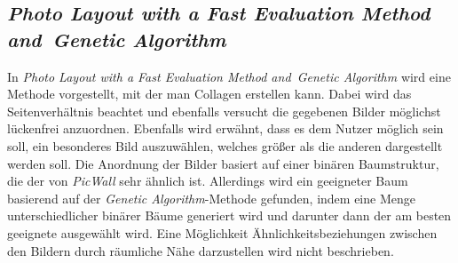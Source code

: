 \documentclass[12pt, ngerman, utf8]{article}
\begin{document}
\subsection{\emph{Photo Layout with a Fast Evaluation Method and Genetic Algorithm}}
In \emph{Photo Layout with a Fast Evaluation Method and Genetic Algorithm} \cite{photo-layout} wird eine Methode vorgestellt, mit der man Collagen erstellen kann. Dabei wird das Seitenverhältnis beachtet und ebenfalls versucht die gegebenen Bilder möglichst lückenfrei anzuordnen. Ebenfalls wird erwähnt, dass es dem Nutzer möglich sein soll, ein besonderes Bild auszuwählen, welches größer als die anderen dargestellt werden soll. Die Anordnung der Bilder basiert auf einer binären Baumstruktur, die der von \textit{PicWall} sehr ähnlich ist. Allerdings wird ein geeigneter Baum basierend auf der \emph{Genetic Algorithm}-Methode gefunden, indem eine Menge unterschiedlicher binärer Bäume generiert wird und darunter dann der am besten geeignete ausgewählt wird. Eine Möglichkeit Ähn\-lich\-keits\-be\-zieh\-ung\-en zwischen den Bildern durch räumliche Nähe darzustellen wird nicht beschrieben.

\nocite{*}
\end{document}

